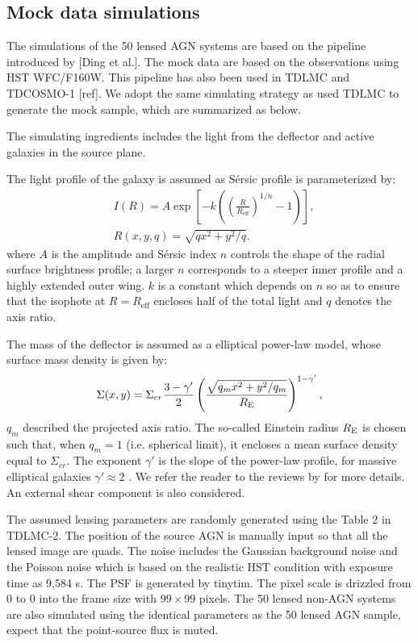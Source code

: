 \documentclass[useAMS,usenatbib,usegraphicx]{mn2e}
\begin{document}
\subsection{Mock data simulations}
The simulations of the 50 lensed AGN systems are based on the pipeline introduced by [Ding et al.].  The mock data are based on the observations using HST WFC/F160W.
This pipeline has also been used in TDLMC and TDCOSMO-1 [ref]. We adopt the same simulating strategy as used TDLMC to generate the mock sample, which are summarized as below.

The simulating ingredients includes the light from the deflector and active galaxies in the source plane. 

The light profile of the galaxy is assumed as S\'ersic profile is parameterized by:
\begin{eqnarray}
   \label{eq:sersic}
   &I(R) = A \exp\left[-k\left(\left(\frac{R}{R_{\mathrm{eff}}}\right)^{1/n}-1\right)\right] ,\\
   &R(x,y,q) = \sqrt{qx^2+y^2/q}.
\end{eqnarray}
%
where $A$ is the amplitude and S\'ersic index $n$ controls the shape of the radial
surface brightness profile; a larger $n$ corresponds to a steeper
inner profile and a highly extended outer wing. 
 $k$ is a constant which
depends on $n$ so as to ensure that the isophote at $R=R_{\mathrm{eff}}$
encloses half of the total light \citep{C+B99} and
$q$ denotes the axis ratio.

The mass of the deflector is assumed as a elliptical power-law model, whose surface mass density is given by:
%
\begin{equation}
 \label{massmodel}
 \Sigma(x,y)=\Sigma_{cr}\frac{3-\gamma^{\prime}}{2}\left(\frac{\sqrt{q_m x^{2}+y^{2}/q_m}}{R_{\rm E}}\right)^{1-\gamma^{\prime}},
\end{equation}
%
$q_m$ described the projected axis ratio.
The so-called Einstein radius $R_{\rm{E}}$ is chosen such
that, when $q_m=1$ (i.e. spherical limit), it encloses a mean surface
density equal to $\Sigma_{cr}.$
The exponent $\gamma'$ is the slope of the power-law profile,
for massive elliptical galaxies $\gamma' \approx2$  \citep{T+K02a,T+K04,Koo++09}.
We refer the reader to the reviews by \citet{Sch06, Bar10, Tre10} for more details.
An external shear component is also considered.


The assumed lensing parameters are randomly generated using the Table 2 in TDLMC-2. The position of the source AGN is manually input so that all the lensed image are quads. The noise includes the Gaussian background noise and the Poisson noise which is based on the realistic HST condition with exposure time as 9,584 s. The PSF is generated by tinytim. The pixel scale is drizzled from 0 to 0 into the frame size with $99\times99$ pixels. The 50 lensed non-AGN systems are also simulated using the identical parameters as the 50 lensed AGN sample, expect that the point-source flux is muted. 
\end{document}
